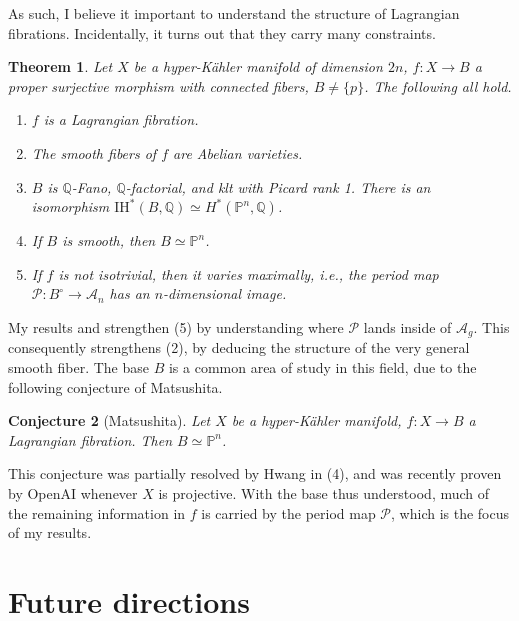 \documentclass[12pt]{amsart}
\newcommand{\Q}{\mathbb{Q}}
\newcommand{\bbP}{\mathbb{P}}
\newcommand{\cP}{\mathcal{P}}
\newcommand{\cA}{\mathcal{A}}
\newcommand{\IH}{\mathrm{IH}}
\newtheorem{theorem}{Theorem}[section]
\newtheorem{conjecture}[theorem]{Conjecture}
\theoremstyle{definition}
\numberwithin{equation}{section}
\begin{document}
As such, I believe it important to understand the structure of Lagrangian fibrations. 
Incidentally, it turns out that they carry many constraints.
\begin{theorem}
    Let \(X\) be a hyper-K\"ahler manifold of dimension \(2n\), \(f: X \to B\) a proper 
    surjective morphism with connected fibers, \(B \neq \{p\}\). The following all hold.
    \begin{enumerate}
        \item \cite{greb-lehn14} \(f\) is a Lagrangian fibration.
        \item \cite{matsushita99} The smooth fibers of \(f\) are Abelian varieties. 
        \item \cite{matsushita16} \(B\) is \(\Q\)-Fano, \(\Q\)-factorial, and klt with 
        Picard rank 1. There is an isomorphism \(\IH^*(B, \Q) \simeq H^*(\bbP^n, \Q)\).
        \item \cite{hwang08} If \(B\) is smooth, then \(B \simeq \bbP^n\).
        \item \cite{bakker25} If \(f\) is not isotrivial, then it varies maximally, i.e., 
        the period map \(\cP: B^\circ \to \cA_{n}\) has an \(n\)-dimensional image.
    \end{enumerate}
\end{theorem}

My results  and  strengthen (5) by understanding 
where \(\mathcal P\) lands inside of \(\mathcal{A}_g\). This consequently strengthens 
(2), by deducing the structure of the very general smooth fiber. The base \(B\) is a 
common area of study in this field, due to the following conjecture of Matsushita.

\begin{conjecture}[Matsushita]
    Let \(X\) be a hyper-K\"ahler manifold, \(f: X \to B\) a Lagrangian fibration. 
    Then \(B \simeq \bbP^n\).
\end{conjecture}

This conjecture was partially resolved by Hwang in (4), and was recently proven
by OpenAI \cite{openai-matsushita} whenever \(X\) is projective. With the base
thus understood, much of the remaining information in \(f\) is carried by the
period map \(\cP\), which is the focus of my results.


\section{Future directions}
\end{document}
